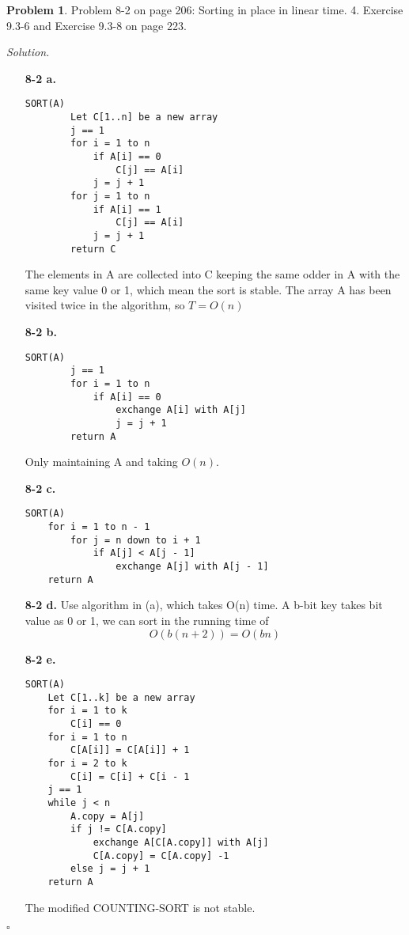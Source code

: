 \documentclass[11pt]{article}
\theoremstyle{definition}
\newtheorem{problem}{Problem}
\newenvironment{solution}{\noindent\emph{Solution.}}{\hfill$\square$}
\begin{document}
\clearpage






\begin{problem}
Problem 8-2 on page 206: Sorting in place in linear time. 4. Exercise 9.3-6 and Exercise 9.3-8 on page 223.
\end{problem}

\begin{solution}
\begin{enumerate}
    \item[\textbf{8-2 a.}]
    \
        \begin{lstlisting}
SORT(A)
		Let C[1..n] be a new array
		j == 1
		for i = 1 to n
			if A[i] == 0
				C[j] == A[i]
			j = j + 1
		for j = 1 to n
			if A[i] == 1
				C[j] == A[i]
			j = j + 1
		return C
\end{lstlisting}
The elements in A are collected into C keeping the same odder in A with the same key value 0 or 1, which mean the sort is stable.
The array A has been visited twice in the algorithm, so $T = O(n)$

    \item[\textbf{8-2 b.}]
    \
        \begin{lstlisting}
SORT(A)
		j == 1
		for i = 1 to n
			if A[i] == 0
				exchange A[i] with A[j]
				j = j + 1
		return A
\end{lstlisting}
Only maintaining A and taking $O(n)$.

    


    \item[\textbf{8-2 c.}]
    \
            \begin{lstlisting}
SORT(A)
	for i = 1 to n - 1
		for j = n down to i + 1
			if A[j] < A[j - 1]
				exchange A[j] with A[j - 1]
	return A
\end{lstlisting}



\item[\textbf{8-2 d.}]
Use algorithm in (a), which takes O(n) time.
A b-bit key takes bit value as 0 or 1, we can sort in the running time of $$ O(b(n + 2)) = O(bn)$$ 

\item[\textbf{8-2 e.}]
\
\begin{lstlisting}
SORT(A)
	Let C[1..k] be a new array
	for i = 1 to k
		C[i] == 0
	for i = 1 to n
		C[A[i]] = C[A[i]] + 1
	for i = 2 to k
		C[i] = C[i] + C[i - 1
	j == 1
	while j < n
		A.copy = A[j]
		if j != C[A.copy]
			exchange A[C[A.copy]] with A[j]
			C[A.copy] = C[A.copy] -1
		else j = j + 1
	return A
\end{lstlisting}
 The modified COUNTING-SORT is not stable.


\end{enumerate}
\end{solution}
\end{document}
